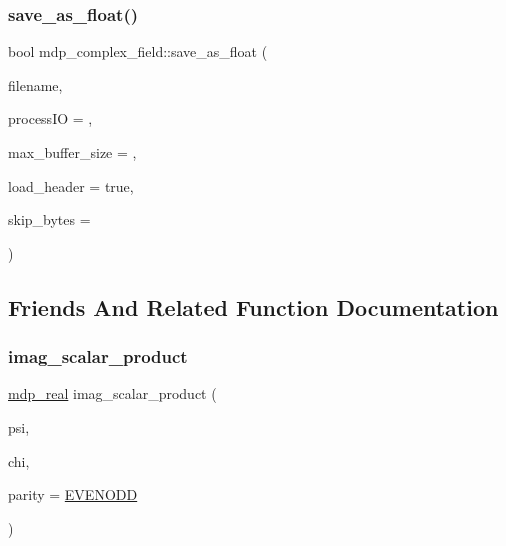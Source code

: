 \subsubsection{\texorpdfstring{save\+\_\+as\+\_\+float()}{save\_as\_float()}}
{\footnotesize\ttfamily bool mdp\+\_\+complex\+\_\+field\+::save\+\_\+as\+\_\+float (\begin{DoxyParamCaption}\item[{string}]{filename,  }\item[{int}]{process\+IO = {},  }\item[{\hyperlink{mdp__global__vars_8h_aaa1ad9d0dcd2124aa5af0120d9954174}{mdp\+\_\+int}}]{max\+\_\+buffer\+\_\+size = {},  }\item[{bool}]{load\+\_\+header = {\ttfamily true},  }\item[{\hyperlink{mdp__global__vars_8h_aaa1ad9d0dcd2124aa5af0120d9954174}{mdp\+\_\+int}}]{skip\+\_\+bytes = {} }\end{DoxyParamCaption})\hspace{0.3cm}{\ttfamily [inline]}}



\subsection{Friends And Related Function Documentation}
\mbox{\label{classmdp__complex__field_a0671bd0b418f625c07f3ba9135e26b12}} 
\subsubsection{\texorpdfstring{imag\+\_\+scalar\+\_\+product}{imag\_scalar\_product}}
{\footnotesize\ttfamily \hyperlink{mdp__global__vars_8h_a69d96b74c791e0bbdb888b3913a69450}{mdp\+\_\+real} imag\+\_\+scalar\+\_\+product (\begin{DoxyParamCaption}\item[{\hyperlink{classmdp__complex__field}{mdp\+\_\+complex\+\_\+field} \&}]{psi,  }\item[{\hyperlink{classmdp__complex__field}{mdp\+\_\+complex\+\_\+field} \&}]{chi,  }\item[{int}]{parity = {\ttfamily \hyperlink{mdp__global__vars_8h_a4c9de81f2de5a74b588107b6c0afb9ee}{E\+V\+E\+N\+O\+DD}} }\end{DoxyParamCaption})\hspace{0.3cm}{\ttfamily [friend]}}

